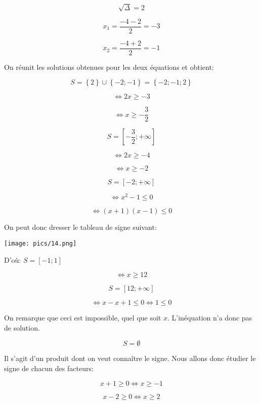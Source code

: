 \documentclass[a4paper,12pt]{scrartcl}
\begin{document}
$$\sqrt{\Delta} = 2$$

$$x_1 = \dfrac{-4 - 2}{2} = -3$$

$$x_2 = \dfrac{-4 + 2}{2} = -1$$

On réunit les solutions obtenues pour les deux équations et obtient: 

$$S = \left\{ 2 \right\} \cup \left\{ -2 ; -1 \right\} = \left\{ -2 ; -1 ; 2 \right\}$$



$$\Leftrightarrow 2x \geqslant -3$$

$$\Leftrightarrow x \geqslant -\dfrac{3}{2}$$

$$S = \left[ -\dfrac{3}{2} ; +\infty \right]$$


$$\Leftrightarrow 2x \geqslant -4$$

$$\Leftrightarrow x \geqslant -2$$

$$S = \left[ -2 ; +\infty \right]$$


$$\Leftrightarrow x^2 - 1 \leqslant 0$$

$$\Leftrightarrow (x + 1)(x - 1) \leqslant 0$$

On peut donc dresser le tableau de signe suivant:

\texttt{[image: pics/14.png]}

D'où: $S = \left[ -1 ; 1 \right]$


$$\Leftrightarrow x  \geqslant 12$$

$$S = \left[ 12 ; +\infty \right]$$


$$\Leftrightarrow x-x+1 \leqslant 0 \Leftrightarrow 1 \leqslant 0$$

On remarque que ceci est impossible, quel que soit $x$. L'inéquation n'a donc pas de solution.

$$S = \emptyset$$


Il s'agit d'un produit dont on veut connaître le signe. Nous allons donc étudier le signe de chacun des facteurs:

$$x+1 \geqslant 0 \Leftrightarrow x \geqslant -1$$

$$x-2 \geqslant 0 \Leftrightarrow x \geqslant 2$$
\end{document}
